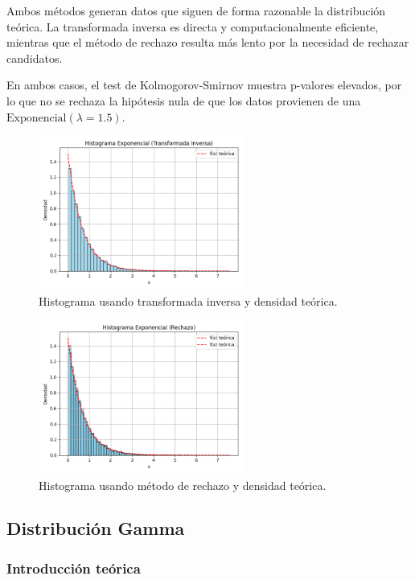\documentclass{article}
\begin{document}
Ambos métodos generan datos que siguen de forma razonable la distribución teórica. La transformada inversa es directa y computacionalmente eficiente, mientras que el método de rechazo resulta más lento por la necesidad de rechazar candidatos.

En ambos casos, el test de Kolmogorov-Smirnov muestra p-valores elevados, por lo que no se rechaza la hipótesis nula de que los datos provienen de una $\text{Exponencial}(\lambda = 1.5)$.

\begin{figure}[H]
    \centering
    \includegraphics[width=0.6\textwidth]{visualizaciones/exponencial_Transformada Inversa.png}
    \caption{Histograma usando transformada inversa y densidad teórica.}
\end{figure}

\begin{figure}[H]
    \centering
    \includegraphics[width=0.6\textwidth]{visualizaciones/exponencial_Rechazo.png}
    \caption{Histograma usando método de rechazo y densidad teórica.}
\end{figure}


\subsection{Distribución Gamma}

\subsubsection{Introducción teórica}
\end{document}
